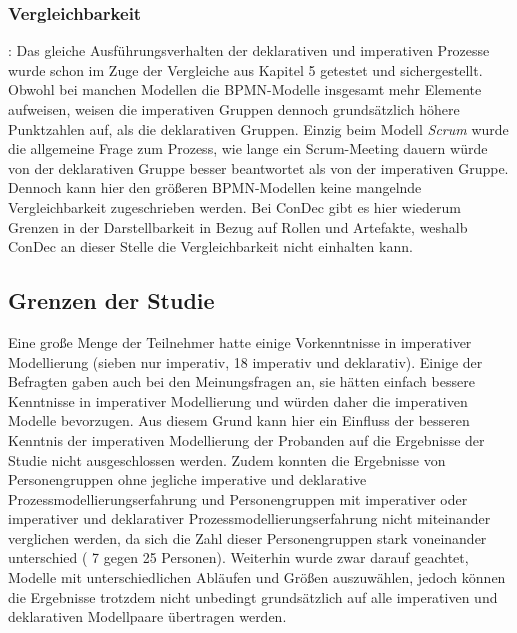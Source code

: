\subsubsection{Vergleichbarkeit}: 
Das gleiche Ausführungsverhalten der deklarativen und imperativen Prozesse wurde schon im Zuge der Vergleiche aus Kapitel 5 getestet und sichergestellt. \newline
Obwohl bei manchen Modellen die BPMN-Modelle insgesamt mehr Elemente aufweisen, weisen die imperativen Gruppen dennoch grundsätzlich höhere Punktzahlen auf, als die deklarativen Gruppen. Einzig beim Modell \textit{Scrum} wurde die allgemeine Frage zum Prozess, wie lange ein Scrum-Meeting dauern würde von der deklarativen Gruppe besser beantwortet als von der imperativen Gruppe. Dennoch kann hier den größeren BPMN-Modellen keine mangelnde Vergleichbarkeit zugeschrieben werden.\newline
Bei ConDec gibt es hier wiederum Grenzen in der Darstellbarkeit in Bezug auf Rollen und Artefakte, weshalb ConDec an dieser Stelle die Vergleichbarkeit nicht einhalten kann.\newline



\subsection{Grenzen der Studie}

Eine große Menge der Teilnehmer hatte einige Vorkenntnisse in imperativer Modellierung (sieben nur imperativ, 18 imperativ und deklarativ). Einige der Befragten gaben auch bei den Meinungsfragen an, sie hätten einfach bessere Kenntnisse in imperativer Modellierung und würden daher die imperativen Modelle bevorzugen. Aus diesem Grund kann hier ein Einfluss der besseren Kenntnis der imperativen Modellierung der Probanden auf die Ergebnisse der Studie nicht ausgeschlossen werden. \newline 
Zudem konnten die Ergebnisse von Personengruppen ohne jegliche imperative und deklarative Prozessmodellierungserfahrung und Personengruppen mit imperativer oder imperativer und deklarativer Prozessmodellierungserfahrung nicht miteinander verglichen werden, da sich die Zahl dieser Personengruppen stark voneinander unterschied ( 7 gegen 25 Personen).\newline
Weiterhin wurde zwar darauf geachtet, Modelle mit unterschiedlichen Abläufen und Größen auszuwählen, jedoch können die Ergebnisse trotzdem nicht unbedingt grundsätzlich auf alle imperativen und deklarativen Modellpaare übertragen werden. \newline

 










